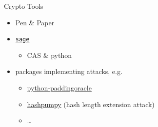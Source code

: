 

{
\begin{frame}


  \vspace{19em}

  \hspace*{\fill}{\Huge Cryptography}


%
%
\end{frame}
}

\begin{frame}
  {Crypto Tools}

  \begin{itemize}
    \item Pen \& Paper
  \end{itemize}
  \begin{itemize}
    \item \texttt{\href{http://www.sagemath.org/}{sage}}
      \begin{itemize}
        \item CAS \& python
      \end{itemize}
    \item packages implementing attacks, e.g.
      \begin{itemize}
        \item \href{http://mwielgoszewski.github.io/python-paddingoracle/}
          {python-paddingoracle}
        \item \href{https://github.com/bwall/HashPump}{hashpumpy} (hash length extension attack)
        \item \ldots
      \end{itemize}
  \end{itemize}
\end{frame}

